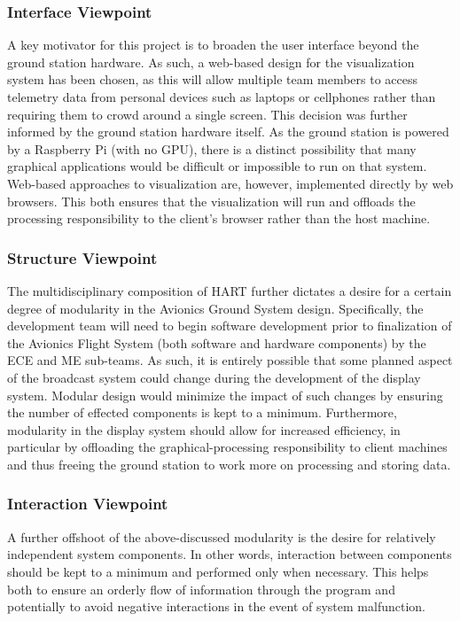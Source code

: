 \documentclass[journal,10pt,onecolumn,compsoc]{IEEEtran}
\begin{document}
		\subsubsection{Interface Viewpoint}
			\noindent A key motivator for this project is to broaden the user interface beyond the ground station hardware.
			As such, a web-based design for the visualization system has been chosen, as this will allow multiple team members to access telemetry data from personal devices such as laptops or cellphones rather than requiring them to crowd around a single screen.
			This decision was further informed by the ground station hardware itself.
			As the ground station is powered by a Raspberry Pi (with no GPU), there is a distinct possibility that many graphical applications would be difficult or impossible to run on that system.
			Web-based approaches to visualization are, however, implemented directly by web browsers.
			This both ensures that the visualization will run and offloads the processing responsibility to the client's browser rather than the host machine.  

		\subsubsection{Structure Viewpoint}
			\noindent The multidisciplinary composition of HART further dictates a desire for a certain degree of modularity in the Avionics Ground System design.
			Specifically, the development team will need to begin software development prior to finalization of the Avionics Flight System (both software and hardware components) by the ECE and ME sub-teams.
			As such, it is entirely possible that some planned aspect of the broadcast system could change during the development of the display system.
			Modular design would minimize the impact of such changes by ensuring the number of effected components is kept to a minimum.
			Furthermore, modularity in the display system should allow for increased efficiency, in particular by offloading the graphical-processing responsibility to client machines and thus freeing the ground station to work more on processing and storing data. 

		\subsubsection{Interaction Viewpoint}
			\noindent A further offshoot of the above-discussed modularity is the desire for relatively independent system components.
			In other words, interaction between components should be kept to a minimum and performed only when necessary.
			This helps both to ensure an orderly flow of information through the program and potentially to avoid negative interactions in the event of system malfunction.
\newpage
\end{document}
